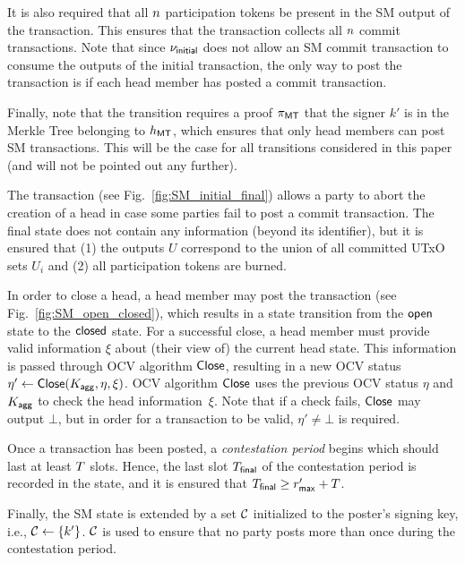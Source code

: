 It is also required that all $n$ participation tokens be present in
the SM output of the \mtxCCom{} transaction.  This ensures that the
\mtxCCom{} transaction collects all $n$ commit transactions.  Note
that since $\nu_\mathsf{initial}$ does not allow an SM commit transaction to
consume the outputs of the initial transaction, the only way to post
the \mtxCCom{} transaction is if each head member has posted a commit
transaction.





Finally, note that the transition requires a proof $\pi_{\mathsf{MT}}$ that the
signer $k'$ is in the Merkle Tree belonging to $h_{\mathsf{MT}}$, which ensures
that only head members can post SM transactions.  This will be the
case for all transitions considered in this paper (and will not be
pointed out any further).


 The \mtxAbort{} transaction
(see Fig.~\ref{fig:SM_initial_final}) allows a party to abort the
creation of a head in case some parties fail to post a commit
transaction.  The final state does not contain any information (beyond
its identifier), but it is ensured that (1) the outputs $U$ correspond
to the union of all committed UTxO sets $U_i$ and (2) all
participation tokens are burned.





 In order to close a head, a head
member may post the \mtxClose{} transaction (see
Fig.~\ref{fig:SM_open_closed}), which results in a state transition
from the $\mathsf{open}$ state to the $\mathsf{closed}$ state.  For a successful
close, a head member must provide valid information $\xi$ about (their
view of) the current head state.  This information is passed through
OCV algorithm $\mathsf{Close}$, resulting in a new OCV status
$\eta' \gets \mathsf{Close}(K_{\mathsf{agg}},\eta,\xi)$.  OCV algorithm $\mathsf{Close}$
uses the previous OCV status $\eta$ and $K_{\mathsf{agg}}$ to check the head
information~$\xi$.  Note that if a check fails, $\mathsf{Close}$ may output
$\bot$, but in order for a \mtxClose{} transaction to be valid,
$\eta' \neq \bot$ is required.

Once a \mtxClose{} transaction has been posted, a \emph{contestation period}
begins which should last at least $T$ slots.  Hence, the last slot
$T_{\mathsf{final}}$ of the contestation period is recorded in the state, and it
is ensured that $T_{\mathsf{final}} \geq r_{\mathsf{max}}' + T$.

Finally, the SM state is extended by a set $\mathcal C$
initialized to the poster's signing key, i.e.,
$\mathcal C \gets \{k'\}$.   $\mathcal C$ is used to ensure that no party
posts more than once during the contestation period.


